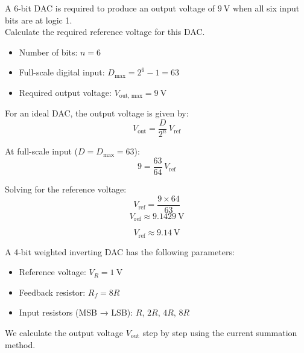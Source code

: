 A 6-bit DAC is required to produce an output voltage of $9 \ \text{V}$ when all six
input bits are at logic 1.\\

Calculate the required reference voltage for this DAC.


\begin{solutionblock}

\begin{itemize}
    \item Number of bits: $n = 6$
    \item Full-scale digital input: $D_{\text{max}} = 2^6 - 1 = 63$
    \item Required output voltage: $V_{\text{out, max}} = 9 \ \text{V}$
\end{itemize}

For an ideal DAC, the output voltage is given by:
\[
V_{\text{out}} = \frac{D}{2^n} \, V_{\text{ref}}
\]

At full-scale input ($D = D_{\text{max}} = 63$):
\[
9 = \frac{63}{64} \, V_{\text{ref}}
\]

Solving for the reference voltage:
\[
V_{\text{ref}} = \frac{9 \times 64}{63}
\]
\[
V_{\text{ref}} \approx 9.1429 \ \text{V}
\]

\[
\boxed{V_{\text{ref}} \approx 9.14 \ \text{V}}
\]

\end{solutionblock}



A 4-bit weighted inverting DAC has the following parameters:

\begin{itemize}
    \item Reference voltage: $V_R = 1 \ \text{V}$
    \item Feedback resistor: $R_f = 8 R$
    \item Input resistors (MSB → LSB): $R$, $2R$, $4R$, $8R$
\end{itemize}

We calculate the output voltage $V_{\text{out}}$ step by step using the current summation method.

